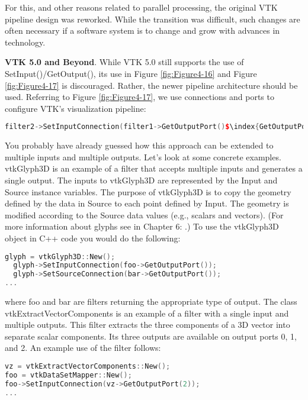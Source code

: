 For this, and other reasons related to parallel processing, the original VTK pipeline design was reworked. While the transition was difficult, such changes are often necessary if a software system is to change and grow with advances in technology.

\textbf{VTK 5.0 and Beyond}. While VTK 5.0 still supports the use of SetInput()/GetOutput(), its use in Figure \ref{fig:Figure4-16} and Figure \ref{fig:Figure4-17} is discouraged. Rather, the newer pipeline architecture should be used. Referring to Figure \ref{fig:Figure4-17}, we use connections and ports to configure VTK's visualization pipeline:

\begin{lstlisting}[language=C++, caption={}, numbers=none, frame=none, escapechar=\$ ]
filter2->SetInputConnection(filter1->GetOutputPort()$\index{GetOutputPort()}$);
\end{lstlisting}

You probably have already guessed how this approach can be extended to multiple inputs and multiple outputs. Let's look at some concrete examples. vtkGlyph3D is an example of a filter that accepts multiple inputs and generates a single output. The inputs to vtkGlyph3D are represented by the Input and Source instance variables. The purpose of vtkGlyph3D is to copy the geometry defined by the data in Source to each point defined by Input. The geometry is modified according to the Source data values (e.g., scalars and vectors). (For more information about glyphs see  in Chapter 6: .) To use the vtkGlyph3D object in C++ code you would do the following:

\begin{lstlisting}[language=C++, caption={}, numbers=none, frame=none]
glyph = vtkGlyph3D::New();
  glyph->SetInputConnection(foo->GetOutputPort());
  glyph->SetSourceConnection(bar->GetOutputPort());
...
\end{lstlisting}

where foo and bar are filters returning the appropriate type of output. The class vtkExtractVectorComponents is an example of a filter with a single input and multiple outputs. This filter extracts the three components of a 3D vector into separate scalar components. Its three outputs are available on output ports 0, 1, and 2. An example use of the filter follows:

\begin{lstlisting}[language=C++, caption={}, numbers=none, frame=none]
vz = vtkExtractVectorComponents::New();
foo = vtkDataSetMapper::New();
foo->SetInputConnection(vz->GetOutputPort(2));
...
\end{lstlisting}

